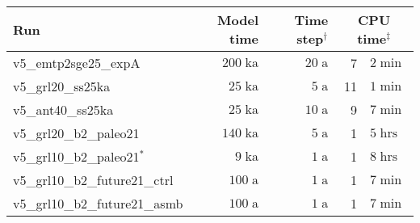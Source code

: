 \documentclass[12pt,a4paper]{article}
\begin{document}
\begin{appendix}
\begin{table}[ht]
\centering
\begin{tabular}{lrrr@{.}l} \hline
Run & Model time & Time step$^\dagger$ 
                 & \multicolumn{2}{c}{CPU time$^\ddagger$} \\ \hline
v5\_emtp2sge25\_expA                 &  $200\;\mathrm{ka}$\hspace*{1.0em}
                                     &   $20\;\mathrm{ a}$\hspace*{1.0em}
                                     &  7&$2\;\mathrm{min}$ \\
v5\_grl20\_ss25ka                    &   $25\;\mathrm{ka}$\hspace*{1.0em}
                                     &    $5\;\mathrm{ a}$\hspace*{1.0em}
                                     & 11&$1\;\mathrm{min}$ \\
v5\_ant40\_ss25ka                    &   $25\;\mathrm{ka}$\hspace*{1.0em}
                                     &   $10\;\mathrm{ a}$\hspace*{1.0em}
                                     &  9&$7\;\mathrm{min}$ \\ \hline
v5\_grl20\_b2\_paleo21               &  $140\;\mathrm{ka}$\hspace*{1.0em}
                                     &    $5\;\mathrm{ a}$\hspace*{1.0em}
                                     &  1&$5\;\mathrm{hrs}$ \\
v5\_grl10\_b2\_paleo21$^\ast$        &    $9\;\mathrm{ka}$\hspace*{1.0em}
                                     &    $1\;\mathrm{ a}$\hspace*{1.0em}
                                     &  1&$8\;\mathrm{hrs}$ \\
v5\_grl10\_b2\_future21\_ctrl        &  $100\;\mathrm{ a}$\hspace*{1.47em}
                                     &    $1\;\mathrm{ a}$\hspace*{1.0em}
                                     &  1&$7\;\mathrm{min}$ \\
v5\_grl10\_b2\_future21\_asmb        &  $100\;\mathrm{ a}$\hspace*{1.47em}
                                     &    $1\;\mathrm{ a}$\hspace*{1.0em}
                                     &  1&$7\;\mathrm{min}$ \\ \hline

\end{tabular}
\end{table}
\end{appendix}
\end{document}
